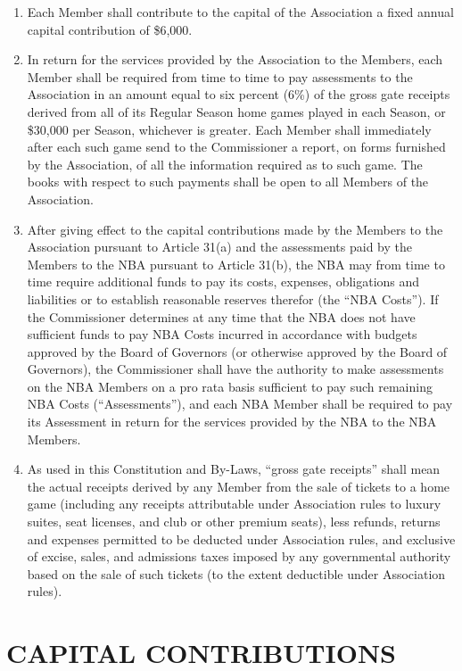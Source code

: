 \documentclass[]{book}
\providecommand{\tightlist}{%
  \setlength{\itemsep}{0pt}\setlength{\parskip}{0pt}}
\begin{document}
\begin{enumerate}
\def\labelenumi{(\alph{enumi})}
\tightlist
\item
  Each Member shall contribute to the capital of the Association a fixed annual capital contribution of \$6,000.
\item
  In return for the services provided by the Association to the Members, each Member shall be required from time to time to pay assessments to the Association in an amount equal to six percent (6\%) of the gross gate receipts derived from all of its Regular Season home games played in each Season, or \$30,000 per Season, whichever is greater. Each Member shall immediately after each such game send to the Commissioner a report, on forms furnished by the Association, of all the information required as to such game. The books with respect to such payments shall be open to all Members of the Association.
\item
  After giving effect to the capital contributions made by the Members to the Association pursuant to Article 31(a) and the assessments paid by the Members to the NBA pursuant to Article 31(b), the NBA may from time to time require additional funds to pay its costs, expenses, obligations and liabilities or to establish reasonable reserves therefor (the ``NBA Costs''). If the Commissioner determines at any time that the NBA does not have sufficient funds to pay NBA Costs incurred in accordance with budgets approved by the Board of Governors (or otherwise approved by the Board of Governors), the Commissioner shall have the authority to make assessments on the NBA Members on a pro rata basis sufficient to pay such remaining NBA Costs (``Assessments''), and each NBA Member shall be required to pay its Assessment in return for the services provided by the NBA to the NBA Members.
\item
  As used in this Constitution and By-Laws, ``gross gate receipts'' shall mean the actual receipts derived by any Member from the sale of tickets to a home game (including any receipts attributable under Association rules to luxury suites, seat licenses, and club or other premium seats), less refunds, returns and expenses permitted to be deducted under Association rules, and exclusive of excise, sales, and admissions taxes imposed by any governmental authority based on the sale of such tickets (to the extent deductible under Association rules).
\end{enumerate}

\hypertarget{capital-contributions}{%
\section{CAPITAL CONTRIBUTIONS}\label{capital-contributions}}
\end{document}
